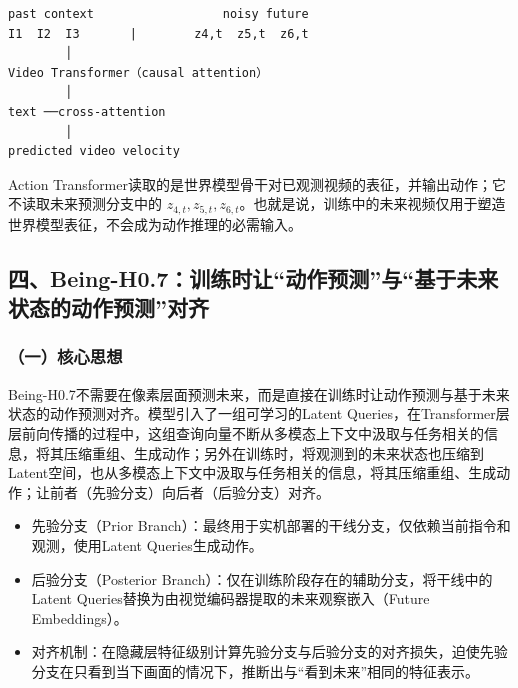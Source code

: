 \begin{verbatim}
past context                  noisy future
I1  I2  I3       |        z4,t  z5,t  z6,t
        │
Video Transformer（causal attention）
        │
text ──cross-attention
        │
predicted video velocity
\end{verbatim}

Action Transformer读取的是世界模型骨干对已观测视频的表征，并输出动作；它不读取未来预测分支中的 \(z_{4,t},z_{5,t},z_{6,t}\)。也就是说，训练中的未来视频仅用于塑造世界模型表征，不会成为动作推理的必需输入。

\hypertarget{ux56dbbeing-h0.7ux8badux7ec3ux65f6ux8ba9ux52a8ux4f5cux9884ux6d4bux4e0eux57faux4e8eux672aux6765ux72b6ux6001ux7684ux52a8ux4f5cux9884ux6d4bux5bf9ux9f50}{%
\subsection{四、Being-H0.7：训练时让``动作预测''与``基于未来状态的动作预测''对齐}\label{ux56dbbeing-h0.7ux8badux7ec3ux65f6ux8ba9ux52a8ux4f5cux9884ux6d4bux4e0eux57faux4e8eux672aux6765ux72b6ux6001ux7684ux52a8ux4f5cux9884ux6d4bux5bf9ux9f50}}

\hypertarget{ux4e00ux6838ux5fc3ux601dux60f3-20}{%
\subsubsection{（一）核心思想}\label{ux4e00ux6838ux5fc3ux601dux60f3-20}}

Being-H0.7不需要在像素层面预测未来，而是直接在训练时让动作预测与基于未来状态的动作预测对齐。模型引入了一组可学习的Latent Queries，在Transformer层层前向传播的过程中，这组查询向量不断从多模态上下文中汲取与任务相关的信息，将其压缩重组、生成动作；另外在训练时，将观测到的未来状态也压缩到Latent空间，也从多模态上下文中汲取与任务相关的信息，将其压缩重组、生成动作；让前者（先验分支）向后者（后验分支）对齐。

\begin{itemize}
\tightlist
\item
  先验分支（Prior Branch）：最终用于实机部署的干线分支，仅依赖当前指令和观测，使用Latent Queries生成动作。
\item
  后验分支（Posterior Branch）：仅在训练阶段存在的辅助分支，将干线中的Latent Queries替换为由视觉编码器提取的未来观察嵌入（Future Embeddings）。
\item
  对齐机制：在隐藏层特征级别计算先验分支与后验分支的对齐损失，迫使先验分支在只看到当下画面的情况下，推断出与``看到未来''相同的特征表示。
\end{itemize}

